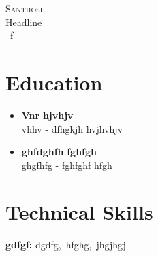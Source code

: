 \documentclass[letterpaper,5pt]{article}
\begin{document}
    

    
    \begin{center}
        {\Huge \scshape Santhosh} \\ \vspace{1pt}
        \large Headline \\ \vspace{1pt}
        \href{mailto:f}{\raisebox{-0.05\height}\faEnvelope \ f} 
         \
         \
         \  
        \vspace{-8pt}
    \end{center}
    
    
      \section{\textbf{Education}}
      
          \begin{itemize}[leftmargin=0in, label={}]
          \item
            \textbf{Vnr} \hfill \textbf{hjvhjv} \\
            vhhv - dfhgkjh \hfill hvjhvhjv
            \vspace*{-3mm}
          \end{itemize}
        
          \begin{itemize}[leftmargin=0in, label={}]
          \item
            \textbf{ghfdghfh} \hfill \textbf{fghfgh} \\
            ghgfhfg - fghfghf \hfill hfgh
            \vspace*{-3mm}
          \end{itemize}
        
        \vspace{3mm}
    
    
    
    \vspace*{-5mm}

    
    
    
    
      \section{\textbf{Technical Skills}}
      \begin{itemize}[leftmargin=0.15in, label={}]
      \small{\item{
        
        \textbf{gdfgf:} dgdfg,  \,hfghg,  \,jhgjhgj \ \\
          
        
        
      }}
      \end{itemize}
      \vspace{-16pt}
      
\end{document}

